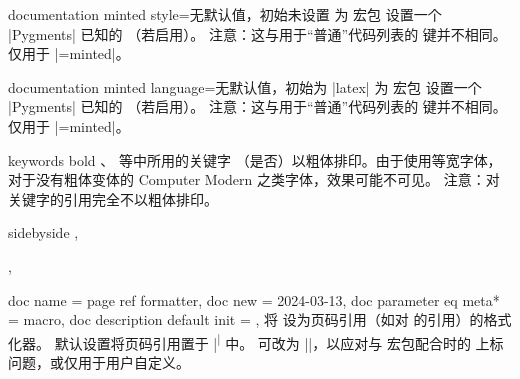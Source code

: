\begin{docTcbKey}{documentation minted style}{=}{无默认值，初始未设置}
  为  宏包 \cite{poore:minted} 设置一个
  |Pygments| \cite{pygments:web} 已知的 （若启用）。
  注意：这与用于\enquote{普通}代码列表的  键并不相同。\\
  仅用于 |=minted|。
\end{docTcbKey}

\begin{docTcbKey}[][doc new=2017-04-24]{documentation minted language}{=}{无默认值，初始为 |latex|}
  为  宏包 \cite{poore:minted} 设置一个
  |Pygments| \cite{pygments:web} 已知的 （若启用）。
  注意：这与用于\enquote{普通}代码列表的  键并不相同。\\
  仅用于 |=minted|。
\end{docTcbKey}

\clearpage

\begin{docTcbKey}[][doc new=2017-04-25]{keywords bold}{}{}
  、 等中所用的关键字
  （是否）以粗体排印。由于使用等宽字体，对于没有粗体变体的
  Computer Modern 之类字体，效果可能不可见。
  注意：对关键字的引用完全不以粗体排印。
\begin{dispExample*}{sidebyside}
\LARGE
{}, 

, 
\end{dispExample*}
\end{docTcbKey}


\begin{docTcbKeys}
  {
    {
      doc name               = page ref formatter,
      doc new                = {2024-03-13},
      doc parameter eq meta* = macro,
      doc description default init = {}{},
    }
  }
将  设为页码引用（如对  的引用）的格式化器。
默认设置将页码引用置于 |\textsuperscript| 中。
可改为 |\fakesuperscript|，以应对与  宏包配合时的
上标问题，或仅用于用户自定义。
\end{docTcbKeys}


